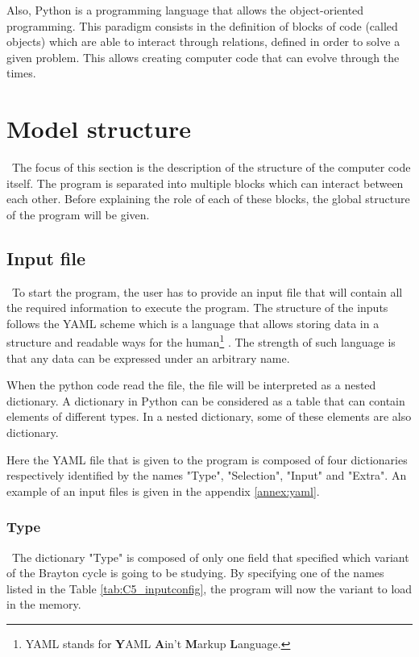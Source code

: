 Also, Python is a programming language that allows the object-oriented programming. This paradigm consists in the definition of blocks of code (called objects) which are able to interact through relations, defined in order to solve a given problem. This allows creating computer code that can evolve through the times. 

\section{Model structure}
\quad\, The focus of this section is the description of the structure of the computer code itself. The program is separated into multiple blocks which can interact between each other. Before explaining the role of each of these blocks, the global structure of the program will be given.

\subsection{Input file}
\quad\, To start the program, the user has to provide an input file that will contain all the required information to execute the program. The structure of the inputs follows the YAML scheme which is a language that allows storing data in a structure and readable ways for the human\footnote{YAML stands for \textbf{Y}AML \textbf{A}in't \textbf{M}arkup \textbf{L}anguage.} . The strength of such language is that any data can be expressed under an arbitrary name. 

When the python code read the file, the file will be interpreted as a nested dictionary. A dictionary in Python can be considered as a table that can contain elements of different types. In a nested dictionary, some of these elements are also dictionary.

Here the YAML file that is given to the program is composed of four dictionaries respectively identified by the names "Type", "Selection", "Input" and "Extra". An example of an input files is given in the appendix \ref{annex:yaml}. 

\subsubsection{Type}
\quad\ The dictionary "Type" is composed of only one field that specified which variant of the Brayton cycle is going to be studying. By specifying one of the names listed in the Table \ref{tab:C5_inputconfig}, the program will now the variant to load in the memory.

